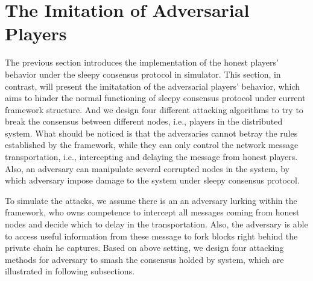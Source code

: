 \documentclass{llncs}
\begin{document}
\section{The Imitation of Adversarial Players}
\quad The previous section introduces the implementation of the honest players' behavior under the sleepy consensus protocol in simulator. This section, in contrast, will present the imitatation of the adversarial players' behavior, which aims to hinder the normal functioning of sleepy consensus protocol under current framework structure. And we design four different attacking algorithms to try to break the consensus between different nodes, i.e., players in the distributed system. What should be noticed is that the adversaries cannot betray the rules established by the framework, while they can only control the network message transportation, i.e., intercepting and delaying the message from honest players. Also, an adversary can manipulate several corrupted nodes in the system, by which adversary impose damage to the system under sleepy consensus protocol.

To simulate the attacks, we assume there is an an adversary lurking within the  framework, who owns competence to intercept all messages coming from honest nodes and decide which to delay in the transportation. Also, the adversary is able to access useful information from these message to fork blocks right behind the private chain he captures. Based on above setting, we design four attacking methods for adversary to smash the consensus holded by system, which are illustrated in following subsections.
\end{document}

